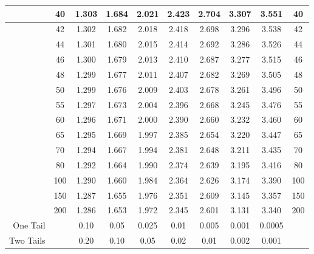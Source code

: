 \documentclass[12 pt, letterpaper]{letter}
\begin{document}
\begin{table}[h]
\begin{center}
\begin{tabular}{|r|c|c|c|c|c|c|c|c|c|}
\hline    &40 &   1.303 &  1.684 &  2.021 &  2.423 &  2.704 &  3.307 &  3.551 &  40  \\
\hline    &42 &   1.302 &  1.682 &  2.018 &  2.418 &  2.698 &  3.296 &  3.538 &  42  \\
\hline    &44 &   1.301 &  1.680 &  2.015 &  2.414 &  2.692 &  3.286 &  3.526 &  44  \\
\hline    &46 &   1.300 &  1.679 &  2.013 &  2.410 &  2.687 &  3.277 &  3.515 &  46  \\
\hline    &48 &   1.299 &  1.677 &  2.011 &  2.407 &  2.682 &  3.269 &  3.505 &  48  \\
\hline    &50 &   1.299 &  1.676 &  2.009 &  2.403 &  2.678 &  3.261 &  3.496 &  50 \\
\hline    &55 &   1.297 &  1.673 &  2.004 &  2.396 &  2.668 &  3.245 &  3.476 &  55  \\
\hline    &60 &   1.296 &  1.671 &  2.000 &  2.390 &  2.660 &  3.232 &  3.460 &  60  \\
\hline    &65 &   1.295 &  1.669 &  1.997 &  2.385 &  2.654 &  3.220 &  3.447 &  65  \\
\hline    &70 &   1.294 &  1.667 &  1.994 &  2.381 &  2.648 &  3.211 &  3.435 &  70  \\
\hline    &80 &   1.292 &  1.664 &  1.990 &  2.374 &  2.639 &  3.195 &  3.416 &  80  \\
\hline   &100 &   1.290 &  1.660 &  1.984 &  2.364 &  2.626 &  3.174 &  3.390 & 100  \\  
\hline   &150 &   1.287 &  1.655 &  1.976 &  2.351 &  2.609 &  3.145 &  3.357 & 150  \\
\hline   &200 &   1.286 &  1.653 &  1.972 &  2.345 &  2.601 &  3.131 &  3.340 & 200 \\
\hline One Tail& & 0.10 & 0.05 & 0.025 & 0.01 & 0.005 & 0.001 & 0.0005 &\\ 
\hline Two Tails& & 0.20 &   0.10 &   0.05 &   0.02  &  0.01  &  0.002 & 0.001 & \\ 
\hline 
\end{tabular} 
\end{center}
\end{table}
\vspace{-2 in}
\end{document}
